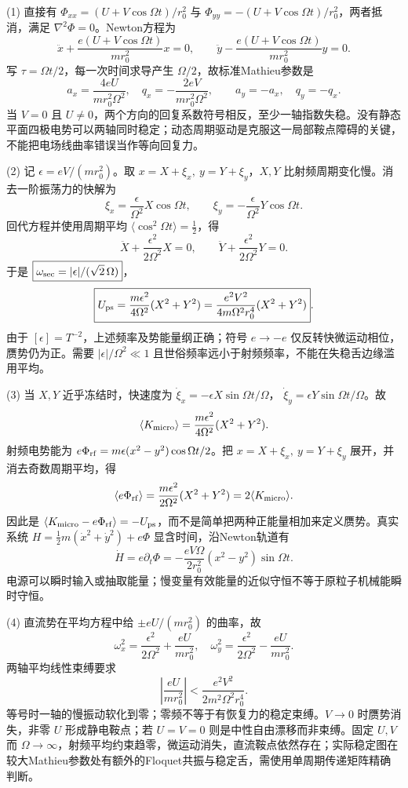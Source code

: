 (1) 直接有 \(\Phi_{xx}=(U+V\cos\Omega t)/r_0^2\) 与 \(\Phi_{yy}=-(U+V\cos\Omega t)/r_0^2\)，两者抵消，满足 \(\nabla^2\Phi=0\)。Newton方程为
\[
\ddot x+\frac{e(U+V\cos\Omega t)}{mr_0^2}x=0,\qquad
\ddot y-\frac{e(U+V\cos\Omega t)}{mr_0^2}y=0.
\]
写 \(\tau=\Omega t/2\)，每一次时间求导产生 \(\Omega/2\)，故标准Mathieu参数是
\[
\boxed{a_x=\frac{4eU}{mr_0^2\Omega^2},\quad q_x=-\frac{2eV}{mr_0^2\Omega^2},\qquad
a_y=-a_x,\quad q_y=-q_x}.
\]
当 \(V=0\) 且 \(U\ne0\)，两个方向的回复系数符号相反，至少一轴指数失稳。没有静态平面四极电势可以两轴同时稳定；动态周期驱动是克服这一局部鞍点障碍的关键，不能把电场线曲率错误当作等向回复力。

(2) 记 \(\epsilon=eV/(mr_0^2)\)。取 \(x=X+\xi_x,\ y=Y+\xi_y\)，\(X,Y\) 比射频周期变化慢。消去一阶振荡力的快解为
\[
\xi_x=\frac{\epsilon}{\Omega^2}X\cos\Omega t,\qquad
\xi_y=-\frac{\epsilon}{\Omega^2}Y\cos\Omega t.
\]
回代方程并使用周期平均 \(\langle\cos^2\Omega t\rangle=\tfrac12\)，得
\[
\ddot X+\frac{\epsilon^2}{2\Omega^2}X=0,\qquad
\ddot Y+\frac{\epsilon^2}{2\Omega^2}Y=0.
\]
于是 \(\boxed{\omega_{\rm sec}=|\epsilon|/(\sqrt2\,\Omega)}\)，
\[
\boxed{U_{\rm ps}=\frac{m\epsilon^2}{4\Omega^2}(X^2+Y^2)
=\frac{e^2V^2}{4m\Omega^2r_0^4}(X^2+Y^2)}.
\]
由于 \([\epsilon]=T^{-2}\)，上述频率及势能量纲正确；符号 \(e\to-e\) 仅反转快微运动相位，赝势仍为正。需要 \(|\epsilon|/\Omega^2\ll1\) 且世俗频率远小于射频频率，不能在失稳舌边缘滥用平均。

(3) 当 \(X,Y\) 近乎冻结时，快速度为
\(\dot\xi_x=-\epsilon X\sin\Omega t/\Omega\)，
\(\dot\xi_y=\epsilon Y\sin\Omega t/\Omega\)。故
\[
\langle K_{\rm micro}\rangle=
\frac{m\epsilon^2}{4\Omega^2}(X^2+Y^2).
\]
射频电势能为 \(e\Phi_{\rm rf}=m\epsilon(x^2-y^2)\cos\Omega t/2\)。把 \(x=X+\xi_x,\ y=Y+\xi_y\) 展开，并消去奇数周期平均，得
\[
\langle e\Phi_{\rm rf}\rangle=
\frac{m\epsilon^2}{2\Omega^2}(X^2+Y^2)
=2\langle K_{\rm micro}\rangle.
\]
因此是 \(\langle K_{\rm micro}-e\Phi_{\rm rf}\rangle=-U_{\rm ps}\)，而不是简单把两种正能量相加来定义赝势。真实系统
\(H=\tfrac12m(\dot x^2+\dot y^2)+e\Phi\) 显含时间，沿Newton轨道有
\[
\boxed{\dot H=e\partial_t\Phi=-\frac{eV\Omega}{2r_0^2}(x^2-y^2)\sin\Omega t}.
\]
电源可以瞬时输入或抽取能量；慢变量有效能量的近似守恒不等于原粒子机械能瞬时守恒。

(4) 直流势在平均方程中给 \(\pm eU/(mr_0^2)\) 的曲率，故
\[
\boxed{\omega_x^2=\frac{\epsilon^2}{2\Omega^2}+\frac{eU}{mr_0^2}},\quad
\boxed{\omega_y^2=\frac{\epsilon^2}{2\Omega^2}-\frac{eU}{mr_0^2}}.
\]
两轴平均线性束缚要求
\[
\boxed{\left|\frac{eU}{mr_0^2}\right|<
\frac{e^2V^2}{2m^2\Omega^2r_0^4}}.
\]
等号时一轴的慢振动软化到零；零频不等于有恢复力的稳定束缚。\(V\to0\) 时赝势消失，非零 \(U\) 形成静电鞍点；若 \(U=V=0\) 则是中性自由漂移而非束缚。固定 \(U,V\) 而 \(\Omega\to\infty\)，射频平均约束趋零，微运动消失，直流鞍点依然存在；实际稳定图在较大Mathieu参数处有额外的Floquet共振与稳定舌，需使用单周期传递矩阵精确判断。